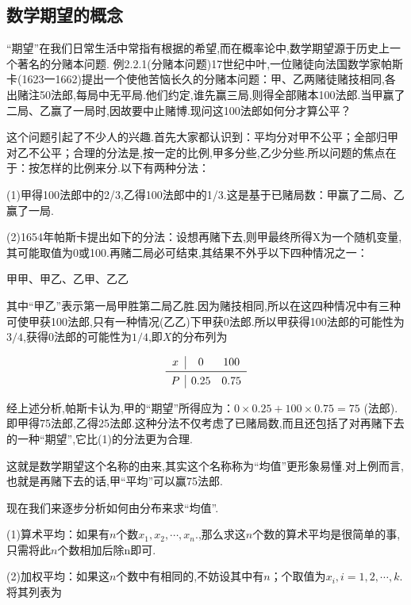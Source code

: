\subsection{数学期望的概念}

“期望”在我们日常生活中常指有根据的希望,而在概率论中,数学期望源于历史上一个著名的分赌本问题.
例2.2.1(分赌本问题)17世纪中叶,一位赌徒向法国数学家帕斯卡(1623一1662)提出一个使他苦恼长久的分赌本问题：甲、乙两赌徒赌技相同,各出赌注50法郎,每局中无平局.他们约定,谁先赢三局,则得全部赌本100法郎.当甲赢了二局、乙赢了一局时,因故要中止赌博.现问这100法郎如何分才算公平？

这个问题引起了不少人的兴趣.首先大家都认识到：平均分对甲不公平；全部归甲对乙不公平；合理的分法是,按一定的比例,甲多分些,乙少分些.所以问题的焦点在于：按怎样的比例来分.以下有两种分法：

(1)甲得100法郎中的2/3,乙得100法郎中的1/3.这是基于已赌局数：甲赢了二局、乙赢了一局.

(2)1654年帕斯卡提出如下的分法：设想再赌下去,则甲最终所得X为一个随机变量,其可能取值为0或100.再赌二局必可结束,其结果不外乎以下四种情况之一：

\begin{center}
	甲甲、甲乙、乙甲、乙乙
\end{center}

其中“甲乙”表示第一局甲胜第二局乙胜.因为赌技相同,所以在这四种情况中有三种可使甲获100法郎,只有一种情况(乙乙)下甲获0法郎.所以甲获得100法郎的可能性为$ 3/4 $,获得0法郎的可能性为$ 1/4 $,即$ X $的分布列为

\[ 
\begin{array}{c|cc}{x} & {0} & {100} \\ \midrule
P & {0.25} & {0.75} \\
\end{array}
\]

经上述分析,帕斯卡认为,甲的“期望”所得应为：$0 \times 0.25+100 \times 0.75=75$
(法郎).即甲得75法郎,乙得25法郎.这种分法不仅考虑了已赌局数,而且还包括了对再赌下去的一种“期望”,它比(1)的分法更为合理.

这就是数学期望这个名称的由来,其实这个名称称为“均值”更形象易懂.对上例而言,也就是再赌下去的话,甲“平均”可以赢75法郎.

现在我们来逐步分析如何由分布来求“均值”.

(1)算术平均：如果有$ n $个数$x_{1}, x_{2}, \cdots, x_{n}$.,那么求这$ n $个数的算术平均是很简单的事,只需将此$ n $个数相加后除n即可.

(2)加权平均：如果这$ n $个数中有相同的,不妨设其中有$ n $；个取值为$x_{i}, i=1,2, \cdots, k$.将其列表为

